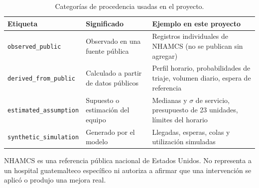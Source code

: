 \begin{table}[ht]
\centering\small
\caption{Categorías de procedencia usadas en el proyecto.}
\label{tab:procedencia}
\begin{tabularx}{\linewidth}{@{}l X X@{}}
\toprule
Etiqueta & Significado & Ejemplo en este proyecto \\
\midrule
\texttt{observed\_public} & Observado en una fuente pública & Registros individuales de NHAMCS (no se publican sin agregar) \\
\texttt{derived\_from\_public} & Calculado a partir de datos públicos & Perfil horario, probabilidades de triaje, volumen diario, espera de referencia \\
\texttt{estimated\_assumption} & Supuesto o estimación del equipo & Medianas y $\sigma$ de servicio, presupuesto de 23 unidades, límites del horario \\
\texttt{synthetic\_simulation} & Generado por el modelo & Llegadas, esperas, colas y utilización simuladas \\
\bottomrule
\end{tabularx}
\end{table}

\begin{alcance}
NHAMCS es una referencia pública nacional de Estados Unidos. No representa a un hospital
guatemalteco específico ni autoriza a afirmar que una intervención se aplicó o produjo una
mejora real.
\end{alcance}

